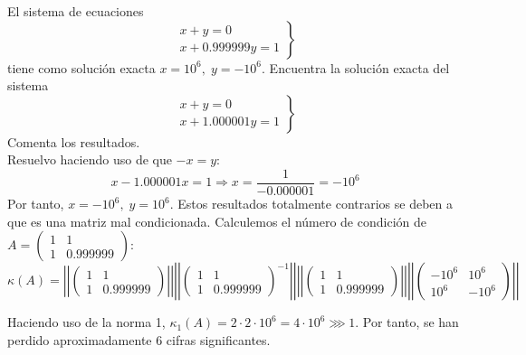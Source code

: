 \begin{ejercicio}
    El sistema de ecuaciones
    \begin{equation*}\left.
        \begin{array}{r}
             x+y=0  \\
             x+0.999999y=1 
        \end{array}\right\}
    \end{equation*}
    tiene como solución exacta $x=10^6,\;y=-10^6$. Encuentra la solución exacta del sistema
    \begin{equation*}\left.
        \begin{array}{r}
             x+y=0  \\
             x+1.000001y=1 
        \end{array}\right\}
    \end{equation*}
    Comenta los resultados.\\

    Resuelvo haciendo uso de que $-x=y$:
    $$x-1.000001x = 1 \Longrightarrow x=\frac{1}{-0.000001} = -10^6$$
    Por tanto, $x=-10^6,\;y=10^6$. Estos resultados totalmente contrarios se deben a que es una matriz mal condicionada. Calculemos el número de condición de $A = \left( \begin{array}{cc}
        1 & 1 \\
        1 & 0.999999
    \end{array} \right)$:
    \begin{equation*}
        \kappa(A) =
        \left|\left|\left(\begin{array}{cc}
            1 & 1 \\
            1 & 0.999999
        \end{array}\right)\right|\right|
        \left|\left|\left(\begin{array}{cc}
            1 & 1 \\
            1 & 0.999999
        \end{array}\right)^{-1}\right|\right|
        \left|\left|\left(\begin{array}{cc}
            1 & 1 \\
            1 & 0.999999
        \end{array}\right)\right|\right|
        \left|\left|\left(\begin{array}{cc}
            -10^6 & 10^6 \\
            10^6 & -10^6
        \end{array}\right)\right|\right|
    \end{equation*}

    Haciendo uso de la norma 1, $\kappa_1(A) = 2\cdot 2\cdot 10^6 = 4\cdot 10^6 \ggg1$. Por tanto, se han perdido aproximadamente 6 cifras significantes.
\end{ejercicio}

